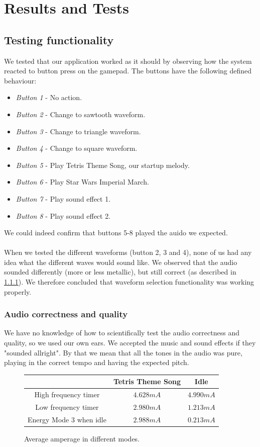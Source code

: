 \section{Results and Tests}

\subsection{Testing functionality}
We tested that our application worked as it should by observing how the system reacted to button press on the gamepad. The buttons have the following defined behaviour:
\begin{itemize}
	\item \emph{Button 1} - No action. 
	\item \emph{Button 2} - Change to sawtooth waveform.
	\item \emph{Button 3} - Change to triangle waveform.
	\item \emph{Button 4} - Change to square waveform.
	\item \emph{Button 5} - Play Tetris Theme Song, our startup melody.
	\item \emph{Button 6} - Play Star Wars Imperial March.
	\item \emph{Button 7} - Play sound effect 1.
	\item \emph{Button 8} - Play sound effect 2.
\end{itemize}

We could indeed confirm that buttons 5-8 played the auido we expected. \\
\\
When we tested the different waveforms (button 2, 3 and 4), none of us had any idea what the different waves would sound like. We observed that the audio sounded differently (more or less metallic), but still correct (as described in \ref{audio_correctness}). We therefore concluded that waveform selection functionality was working properly.

\subsubsection{Audio correctness and quality}
\label{audio_correctness}
We have no knowledge of how to scientifically test the audio correctness and quality, so we used our own ears. We accepted the music and sound effects if they "sounded allright". By that we mean that all the tones in the audio was pure, playing in the correct tempo and having the expected pitch. 

\begin{figure}[h]
	\centering
	\begin{tabular}{c | c  c}
			& Tetris Theme Song & Idle \\
		\hline
		\hline
		High frequency timer & $4.628mA$ & $4.990mA$ \\
		Low frequency timer & $2.980mA$ & $1.213mA$ \\
		Energy Mode 3 when idle & $2.988mA$ & $0.213mA$ \\

	\end{tabular}
	\caption{Average amperage in different modes.}
	\label{fig:energy_results}

\end{figure}

